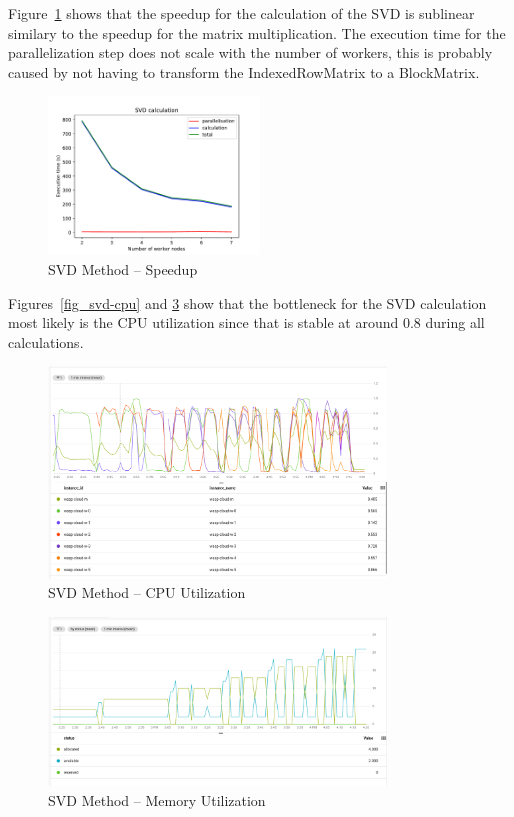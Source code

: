 \documentclass{prog_report}
\begin{document}
Figure~\ref{fig:svd} shows that the speedup for the calculation of the SVD is sublinear similary to the speedup for the matrix multiplication. The execution time for the parallelization step does not scale with the number of workers, this is probably caused by not having to transform the IndexedRowMatrix to a BlockMatrix.
\begin{figure}[h]
    \centering
    \includegraphics[width=0.5\textwidth]{img/svd-speedup}
    \caption{SVD Method – Speedup}
    \label{fig:svd}
\end{figure}

Figures~\ref{fig_svd-cpu} and \ref{fig:svd-mem} show that the bottleneck for the SVD calculation most likely is the CPU utilization since that is stable at around 0.8 during all calculations.

\begin{figure}[h]
    \centering
    \includegraphics[width=0.8\textwidth]{img/svd-cpu}
    \caption{SVD Method – CPU Utilization}
    \label{fig:svd-cpu}
\end{figure}

\begin{figure}[h]
    \centering
    \includegraphics[width=0.8\textwidth]{img/svd-memory}
    \caption{SVD Method – Memory Utilization}
    \label{fig:svd-mem}
\end{figure}
\end{document}
